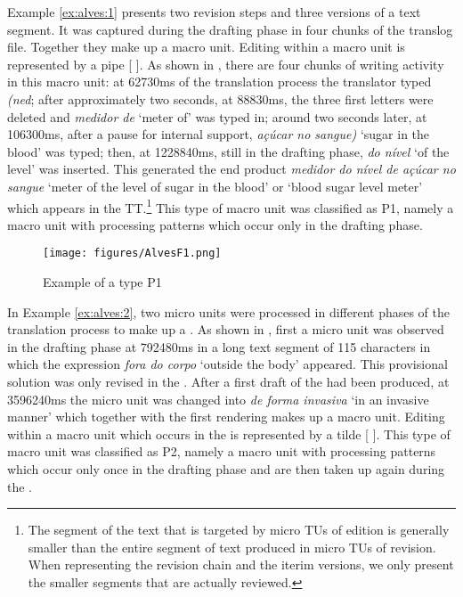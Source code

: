 \documentclass[output=paper]{LSP/langsci}
\begin{document}
Example \ref{ex:alves:1} presents two revision steps and three versions of a text segment. It was captured during the drafting phase in four chunks of the translog file. Together they make up a macro unit. Editing within a macro unit is represented by a pipe [ {\textbar} ]. As shown in , there are four chunks of writing activity in this macro unit: at 62730ms of the translation process the translator typed \textit{(ned}; after approximately two seconds, at 88830ms, the three first letters were deleted and \textit{medidor de} `meter of' was typed in; around two seconds later, at 106300ms, after a pause for internal support, \textit{açúcar no sangue)} `sugar in the blood' was typed; then, at 1228840ms, still in the drafting phase, \textit{do nível} `of the level' was inserted. This generated the end product \textit{medidor do nível de açúcar no sangue} `meter of the level of sugar in the blood' or `blood sugar level meter' which appears in the TT.\footnote{The segment of the text that is targeted by micro TUs of edition is generally smaller than the entire segment of text produced in micro TUs of revision. When representing the revision chain and the iterim versions, we only present the smaller segments that are actually reviewed.} This type of macro unit was classified as P1, namely a macro unit with processing patterns which occur only in the drafting phase. 

\begin{figure}
\texttt{[image: figures/AlvesF1.png]}
\caption{Example of a  type P1}
\label{fig:alves:1}
\end{figure} 

In Example \ref{ex:alves:2}, two micro units were processed in different phases of the translation process to make up a . As shown in , first a micro unit was observed in the drafting phase at 792480ms in a long text segment of 115 characters in which the expression \textit{fora do corpo} `outside the body' appeared. This provisional solution was only revised in the . After a first draft of the  had been produced, at 3596240ms the micro unit was changed into \textit{de forma invasiva} `in an invasive manner' which together with the first rendering makes up a macro unit. Editing within a macro unit which occurs in the  is represented by a tilde [ {\Tilde} ]. This type of macro unit was classified as P2, namely a macro unit with processing patterns which occur only once in the drafting phase and are then taken up again during the .
\end{document}
